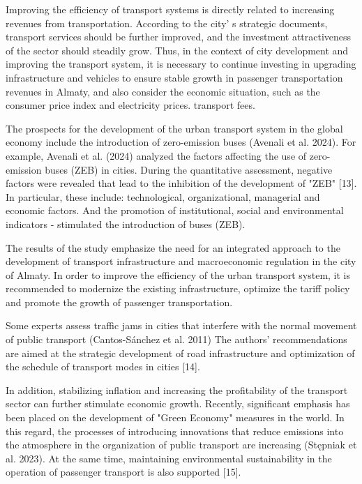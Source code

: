 Improving the efficiency of transport systems is directly related to
increasing revenues from transportation. According to the
city' s strategic documents, transport services should be
further improved, and the investment attractiveness of the sector should
steadily grow. Thus, in the context of city development and improving
the transport system, it is necessary to continue investing in upgrading
infrastructure and vehicles to ensure stable growth in passenger
transportation revenues in Almaty, and also consider the economic
situation, such as the consumer price index and electricity prices.
transport fees.

The prospects for the development of the urban transport system in the
global economy include the introduction of zero-emission buses (Avenali
et al. 2024). For example, Avenali et al. (2024) analyzed the factors
affecting the use of zero-emission buses (ZEB) in cities. During the
quantitative assessment, negative factors were revealed that lead to the
inhibition of the development of "ZEB" {[}13{]}. In particular, these
include: technological, organizational, managerial and economic factors.
And the promotion of institutional, social and environmental indicators
- stimulated the introduction of buses (ZEB).

The results of the study emphasize the need for an integrated approach
to the development of transport infrastructure and macroeconomic
regulation in the city of Almaty. In order to improve the efficiency of
the urban transport system, it is recommended to modernize the existing
infrastructure, optimize the tariff policy and promote the growth of
passenger transportation.

Some experts assess traffic jams in cities that interfere with the
normal movement of public transport (Cantos-Sánchez et al. 2011) The
authors'{} recommendations are aimed at the strategic
development of road infrastructure and optimization of the schedule of
transport modes in cities {[}14{]}.

In addition, stabilizing inflation and increasing the profitability of
the transport sector can further stimulate economic growth. Recently,
significant emphasis has been placed on the development of "Green
Economy" measures in the world. In this regard, the processes of
introducing innovations that reduce emissions into the atmosphere in the
organization of public transport are increasing (Stępniak et al. 2023).
At the same time, maintaining environmental sustainability in the
operation of passenger transport is also supported {[}15{]}.

